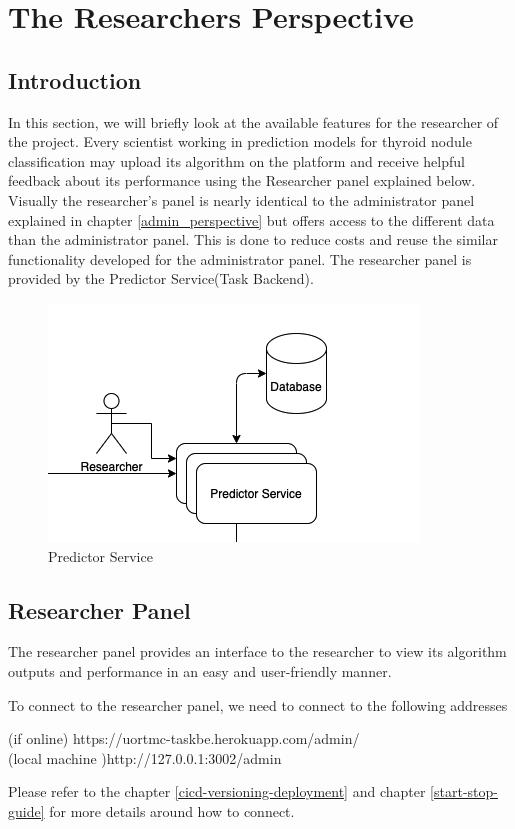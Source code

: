 \chapter{The Researchers Perspective}
\label{researchers_perspective}
	\section{Introduction}
		In this section, we will briefly look at the available features for the researcher of the project. 
		Every scientist working in prediction models for thyroid nodule classification may upload its algorithm 
		on the platform and receive helpful feedback about its performance using the Researcher panel explained below. 
		Visually the researcher's panel is nearly identical to the administrator panel explained in chapter 
		\ref{admin_perspective} but offers access to the different data than the administrator panel. This is done 
		to reduce costs and reuse the similar functionality developed for the administrator panel. The researcher panel 
		is provided by the Predictor Service(Task Backend).
		\begin{figure}[H]
			\iftrue
			\caption{Predictor Service}
			\centering
			\includegraphics[scale=0.5]{figures/taskbe}
			\fi
		\end{figure}
	\section{Researcher Panel}
		The researcher panel provides an interface to the researcher to view its algorithm outputs and performance in an easy and user-friendly manner.
		\begin{note}
			To connect to the researcher panel, we need to connect to the following addresses\\
			\begin{center}
				(if online) https://uortmc-taskbe.herokuapp.com/admin/ \\
				(local machine )http://127.0.0.1:3002/admin
			\end{center}
			Please refer to the chapter \ref{cicd-versioning-deployment} and chapter \ref{start-stop-guide} for more details around how to connect.
		\end{note}
